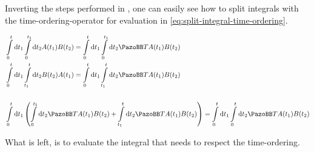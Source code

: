 Inverting the steps performed in \cite{dissectTimeOrderingIntegrals}, one can easily see how to split integrals with the time-ordering-operator for evaluation in \autoref{eq:split-integral-time-ordering}.

\begin{equation}
    \label{eq:split-integral-time-ordering}
    \begin{split}
        &\int\limits_0^t \mathrm{d}t_1 \int\limits_0^{t_1} \mathrm{d}t_2 A(t_1) B(t_2)  = \int\limits_0^t \mathrm{d}t_1 \int\limits_0^{t_1} \mathrm{d}t_2  \timeOrderingOperator A(t_1) B(t_2) \\
        &\int\limits_0^t \mathrm{d}t_1 \int\limits_{t_1}^t \mathrm{d}t_2  B(t_2) A(t_1)  = \int\limits_0^t \mathrm{d}t_1 \int\limits_{t_1}^t \mathrm{d}t_2  \timeOrderingOperator A(t_1) B(t_2) \\\\
        &\int\limits_0^t \mathrm{d}t_1 \left( \int\limits_0^{t_1} \mathrm{d}t_2 \timeOrderingOperator A(t_1) B(t_2) +  \int\limits_{t_1}^t \mathrm{d}t_2 \timeOrderingOperator A(t_1) B(t_2)\right) =
        \int\limits_0^t \mathrm{d}t_1\int\limits_0^t \mathrm{d}t_2 \timeOrderingOperator A(t_1) B(t_2)
    \end{split}
\end{equation}

What is left, is to evaluate the integral that needs to respect the time-ordering.

